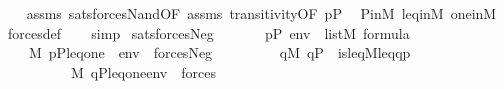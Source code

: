\begin{isabellebody}
%
\isadelimproof
\ \ %
\endisadelimproof
%
\isatagproof
{}\isamarkupfalse%
\ assms\ sats{\isacharunderscore}{\kern0pt}forces{\isacharunderscore}{\kern0pt}Nand{\isacharbrackleft}{\kern0pt}OF\ assms{\isacharparenleft}{\kern0pt}{}{\isacharminus}{\kern0pt}{}{\isacharparenright}{\kern0pt}\ transitivity{\isacharbrackleft}{\kern0pt}OF\ {\isacartoucheopen}p{\isasymin}P{\isacartoucheclose}{\isacharbrackright}{\kern0pt}{\isacharbrackright}{\kern0pt}\isanewline
\ \ P{\isacharunderscore}{\kern0pt}in{\isacharunderscore}{\kern0pt}M\ leq{\isacharunderscore}{\kern0pt}in{\isacharunderscore}{\kern0pt}M\ one{\isacharunderscore}{\kern0pt}in{\isacharunderscore}{\kern0pt}M\ \isamarkupfalse%
\ forces{\isacharunderscore}{\kern0pt}def\isanewline
\ \ \isamarkupfalse%
\ simp%
\endisatagproof
{\isafoldproof}%
%
\isadelimproof
\isanewline
%
\endisadelimproof
\isanewline
{}\isamarkupfalse%
\ sats{\isacharunderscore}{\kern0pt}forces{\isacharunderscore}{\kern0pt}Neg{\isacharprime}{\kern0pt}{\isacharcolon}{\kern0pt}\isanewline
\ \ \isanewline
\ \ \ \ {\isachardoublequoteopen}p{\isasymin}P{\isachardoublequoteclose}\ {\isachardoublequoteopen}env\ {\isasymin}\ list{\isacharparenleft}{\kern0pt}M{\isacharparenright}{\kern0pt}{\isachardoublequoteclose}\ {\isachardoublequoteopen}{\isasymphi}{\isasymin}formula{\isachardoublequoteclose}\isanewline
\ \ \isanewline
\ \ \ \ {\isachardoublequoteopen}M{\isacharcomma}{\kern0pt}\ {\isacharbrackleft}{\kern0pt}p{\isacharcomma}{\kern0pt}P{\isacharcomma}{\kern0pt}leq{\isacharcomma}{\kern0pt}one{\isacharbrackright}{\kern0pt}\ {\isacharat}{\kern0pt}\ env\ {\isasymTurnstile}\ forces{\isacharparenleft}{\kern0pt}Neg{\isacharparenleft}{\kern0pt}{\isasymphi}{\isacharparenright}{\kern0pt}{\isacharparenright}{\kern0pt}\ \ \ {\isasymlongleftrightarrow}\ \isanewline
\ \ \ \ \ {\isasymnot}{\isacharparenleft}{\kern0pt}{\isasymexists}q{\isasymin}M{\isachardot}{\kern0pt}\ q{\isasymin}P\ {\isasymand}\ is{\isacharunderscore}{\kern0pt}leq{\isacharparenleft}{\kern0pt}{\isacharhash}{\kern0pt}{\isacharhash}{\kern0pt}M{\isacharcomma}{\kern0pt}leq{\isacharcomma}{\kern0pt}q{\isacharcomma}{\kern0pt}p{\isacharparenright}{\kern0pt}\ {\isasymand}\ \isanewline
\ \ \ \ \ \ \ \ \ \ M{\isacharcomma}{\kern0pt}\ {\isacharbrackleft}{\kern0pt}q{\isacharcomma}{\kern0pt}P{\isacharcomma}{\kern0pt}leq{\isacharcomma}{\kern0pt}one{\isacharbrackright}{\kern0pt}{\isacharat}{\kern0pt}env\ {\isasymTurnstile}\ forces{\isacharparenleft}{\kern0pt}{\isasymphi}{\isacharparenright}{\kern0pt}{\isacharparenright}{\kern0pt}{\isachardoublequoteclose}\isanewline

\end{isabellebody}
